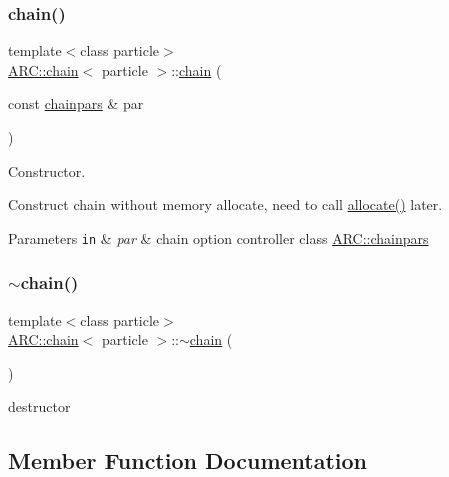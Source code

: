 \subsubsection{\texorpdfstring{chain()}{chain()}\hspace{0.1cm}{\footnotesize\ttfamily [2/2]}}
{\footnotesize\ttfamily template$<$class particle$>$ \\
\hyperlink{classARC_1_1chain}{A\+R\+C\+::chain}$<$ particle $>$\+::\hyperlink{classARC_1_1chain}{chain} (\begin{DoxyParamCaption}\item[{const \hyperlink{classARC_1_1chainpars}{chainpars} \&}]{par }\end{DoxyParamCaption})\hspace{0.3cm}{\ttfamily [inline]}}



Constructor. 

Construct chain without memory allocate, need to call \hyperlink{classARC_1_1chain_ac0bbd32e714913e1e8eb36eb2e8c3fd4}{allocate()} later. 
\begin{DoxyParams}[1]{Parameters}
\mbox{\tt in}  & {\em par} & chain option controller class \hyperlink{classARC_1_1chainpars}{A\+R\+C\+::chainpars} \\
\hline
\end{DoxyParams}
\hypertarget{classARC_1_1chain_a3467a68afb2daebec6c57899897a461c}{}\label{classARC_1_1chain_a3467a68afb2daebec6c57899897a461c} 
\subsubsection{\texorpdfstring{$\sim$chain()}{~chain()}}
{\footnotesize\ttfamily template$<$class particle$>$ \\
\hyperlink{classARC_1_1chain}{A\+R\+C\+::chain}$<$ particle $>$\+::$\sim$\hyperlink{classARC_1_1chain}{chain} (\begin{DoxyParamCaption}{ }\end{DoxyParamCaption})\hspace{0.3cm}{\ttfamily [inline]}}



destructor 



\subsection{Member Function Documentation}
\hypertarget{classARC_1_1chain_a0f91c399beb1e5c0db6ed7e2b4d00477}{}\label{classARC_1_1chain_a0f91c399beb1e5c0db6ed7e2b4d00477} 
